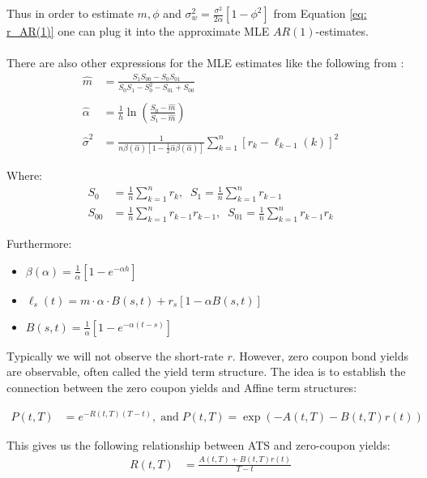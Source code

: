 Thus in order to estimate $m, \phi$ and $\sigma_{w}^{2} = 
\frac{\sigma^{2}}{2\alpha}\left[
    1-\phi^{2}
    \right]
$ from Equation \ref{eq: r_AR(1)} one can plug it into the approximate MLE $AR(1)$-estimates. 
\\~\\ 
There are also other expressions for the MLE estimates like the following from \cite{fergusson2015application}: 
\begin{align*}
\hat{m} &= \frac{
S_{1}S_{00}-S_{0}S_{01}
}{
S_{0}S_{1}-S_{0}^{2}-S_{01} + S_{00}
}\\
\\ 
\hat{\alpha} &= \frac{1}{h}\ln\left(
\frac{S_{0}-\hat{m}}{S_{1}-\hat{m}}
\right) \\ 
\\ 
\hat{\sigma}^{2} &= 
\frac{
1}{
n\beta(\hat{\alpha})[1-\frac{1}{2}\hat{\alpha}\beta(\hat{\alpha})]
}
\sum_{k=1}^{n}[
r_{k}-\ell_{k-1}(k)
]^{2}
\end{align*}

\newpage 

Where:
\begin{align*}
S_{0} &= \frac{1}{n}\sum_{k=1}^{n}r_{k}, \;\; 
S_{1} = \frac{1}{n}\sum_{k=1}^{n}r_{k-1} \\ 
S_{00} &= \frac{1}{n}\sum_{k=1}^{n}r_{k-1}r_{k-1}, \;\; 
S_{01} = \frac{1}{n}\sum_{k=1}^{n}r_{k-1}r_{k}
\end{align*}

Furthermore: 
\begin{itemize}[leftmargin =*]
    \item $\beta(\alpha) =\frac{1}{\alpha}\left[
    1 - e^{-\alpha h}
    \right]$ 
    \item $\ell_{s}(t) = m\cdot\alpha\cdot B(s,t) + r_{s}[1-\alpha B(s,t)] $ 
    \item $B(s,t) = \frac{1}{\alpha}\left[
    1-e^{-\alpha(t-s)}\right]$
\end{itemize}


Typically we will not observe the short-rate $r$. However, zero coupon bond yields are observable, often called the yield term structure. The idea is to establish the connection between the zero coupon yields and Affine term structures:

\begin{align*}
P(t,T) &= e^{-R(t,T)(T-t)}, \;\text{and}\;
P(t,T) = \exp\left(
-A(t,T) -B(t,T)r(t)
\right)
\end{align*}

This gives us the following relationship between ATS and zero-coupon yields: 
\begin{align*}
R(t,T) &= \frac{
A(t,T) + B(t,T)r(t)
}{
T-t
}    
\end{align*}

